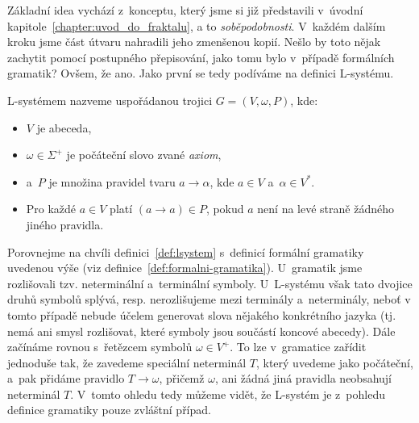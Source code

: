 Základní idea vychází z~konceptu, který jsme si již představili v~úvodní kapitole~\ref{chapter:uvod_do_fraktalu}, a to \emph{soběpodobnosti}. V~každém dalším kroku jsme část útvaru nahradili jeho zmenšenou kopií. Nešlo by toto nějak zachytit pomocí postupného přepisování, jako tomu bylo v~případě formálních gramatik? Ovšem, že ano. Jako první se tedy podíváme na definici L-systému.
\begin{definition}[L-systém]\label{def:lsystem}
    L-systémem nazveme uspořádanou trojici $G=(V,\omega,P)$, kde:
    \begin{itemize}
        \item $V$ je abeceda,
        \item $\omega\in\Sigma^+$ je počáteční slovo zvané \emph{axiom},
        \item a~$P$ je množina pravidel tvaru $a\to\alpha$, kde $a\in V$ a~$\alpha\in V^*$.
        \item Pro každé $a\in V$ platí $(a\to a)\in P$, pokud $a$ není na levé straně žádného jiného pravidla.
    \end{itemize}
\end{definition}
Porovnejme na chvíli definici~\ref{def:lsystem} s~definicí formální gramatiky uvedenou výše (viz definice~\ref{def:formalni-gramatika}). U~gramatik jsme rozlišovali tzv. neterminální a~terminální symboly. U~L-systému však tato dvojice druhů symbolů splývá, resp. nerozlišujeme mezi terminály a~neterminály, neboť v tomto případě nebude účelem generovat slova nějakého konkrétního jazyka (tj. nemá ani smysl rozlišovat, které symboly jsou součástí koncové abecedy). Dále začínáme rovnou s~řetězcem symbolů $\omega\in V^+$. To lze v~gramatice zařídit jednoduše tak, že zavedeme speciální neterminál $T$, který uvedeme jako počáteční, a~pak přidáme pravidlo $T\to\omega$, přičemž $\omega$, ani žádná jiná pravidla neobsahují neterminál $T$. V~tomto ohledu tedy můžeme vidět, že L-systém je z~pohledu definice gramatiky pouze zvláštní případ.

